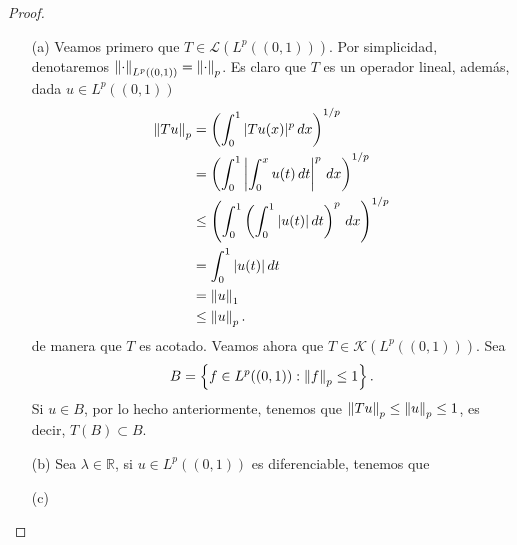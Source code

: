 \begin{proof}
    \begin{enumerate}
        \item[(a)] Veamos primero que $T\in \mathcal{L}(L^p((0,1)))$. Por simplicidad, denotaremos $\left\|\cdot\right\|_{L^p((0,1))}=\left\|\cdot\right\|_p$. Es claro que $T$ es un operador lineal, además, dada $u \in L^p((0,1))$
        \begin{align*}
            \left\|Tu\right\|_p&=\left(\int_{0}^1 |Tu(x)|^p\, dx\right)^{1/p}\\
            &=\left(\int_0^1 \left|\int_0^x u(t)\, dt\right|^p\, dx\right)^{1/p}\\
            &\leq \left(\int_{0}^1\left(\int_0^1 |u(t)|\, dt\right)^p\, dx\right)^{1/p}\\
            &=\int_0^1 |u(t)|\, dt\\
            &=\left\|u\right\|_1\\
            &\leq \left\|u\right\|_p.
        \end{align*}
        de manera que $T$ es acotado. Veamos ahora que $T \in \mathcal{K}(L^p((0,1)))$. Sea
        \begin{align*}
            B=\left\{f \in L^p((0,1)): \left\|f\right\|_p\leq 1\right\}.
        \end{align*}
        Si $u \in B$, por lo hecho anteriormente, tenemos que $\left\|Tu\right\|_p\leq \left\|u\right\|_p\leq 1$, es decir, $T(B)\subset B$.

        \item[(b)] Sea $\lambda\in \mathbb{R}$, si $u\in L^p((0,1))$ es diferenciable, tenemos que 

        \item[(c)]


\end{enumerate}
\end{proof}

